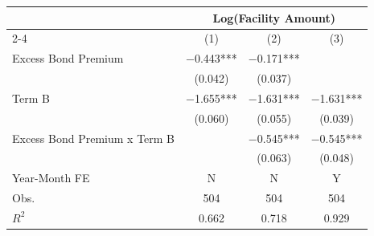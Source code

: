 {
\def\sym#1{\ifmmode^{#1}\else\(^{#1}\)\fi}
\begin{tabular}{l*{3}{c}}
\toprule\toprule
                              &\multicolumn{3}{c}{Log(Facility Amount)}       \\\cmidrule(lr){2-4}
                              &\multicolumn{1}{c}{(1)}   &\multicolumn{1}{c}{(2)}   &\multicolumn{1}{c}{(3)}   \\
\toprule
Excess Bond Premium           &    $-$0.443***&    $-$0.171***&               \\
                              &     (0.042)   &     (0.037)   &               \\
[1em]
Term B                        &    $-$1.655***&    $-$1.631***&    $-$1.631***\\
                              &     (0.060)   &     (0.055)   &     (0.039)   \\
[1em]
Excess Bond Premium x Term B  &               &    $-$0.545***&    $-$0.545***\\
                              &               &     (0.063)   &     (0.048)   \\
\toprule
Year-Month FE                 &           N   &           N   &           Y   \\
Obs.                          &         504   &         504   &         504   \\
$R^2$                         &       0.662   &       0.718   &       0.929   \\
\toprule\toprule
\end{tabular}
}
